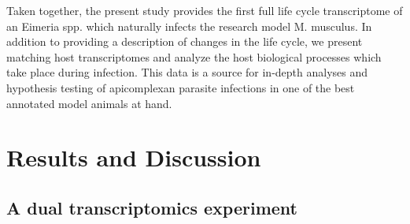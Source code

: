 \documentclass{bmcart}
\begin{document}
Taken together, the present study provides the first full life cycle transcriptome of an Eimeria spp. which naturally infects the research model M. musculus. In addition to providing a description of changes in the life cycle, we present matching host transcriptomes and analyze the host biological processes which take place during infection. This data is a source for in-depth analyses and hypothesis testing of apicomplexan parasite infections in one of the best annotated model animals at hand. 


\section*{Results and Discussion}


\subsection*{A dual transcriptomics experiment}
\end{document}
